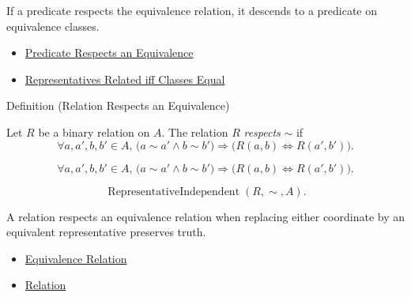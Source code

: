 \begin{remark*}[Interpretation]
If a predicate respects the equivalence relation, it descends to a predicate
on equivalence classes.
\end{remark*}

\begin{dependencies}
\begin{itemize}
  \item \hyperref[def:predicate-respects-equivalence]{Predicate Respects an Equivalence}
  \item \hyperref[prop:representatives-related-iff-classes-equal]{Representatives Related iff Classes Equal}
\end{itemize}
\end{dependencies}

\begin{definitionbox}{Definition (Relation Respects an Equivalence)}
\begin{definition}
\label{def:relation-respects-equivalence}
Let $R$ be a binary relation on $A$. The relation $R$ \emph{respects} $\sim$
if
\[
\forall a,a',b,b'\in A,\,
\bigl(a\sim a'\land b\sim b'\bigr
)
\Longrightarrow
\bigl(R(a,b)\Longleftrightarrow R(a',b')\bigr).
\]
\end{definition}
\end{definitionbox}

\begin{remark*}
\[
\forall a,a',b,b'\in A,\,
\bigl(a\sim a'\land b\sim b'\bigr)
\Longrightarrow
\bigl(R(a,b)\Longleftrightarrow R(a',b')\bigr).
\]
\end{remark*}

\begin{remark*}
\[
\operatorname{RepresentativeIndependent}(R,\sim,A).
\]
\end{remark*}

\begin{remark*}[Interpretation]
A relation respects an equivalence relation when replacing either coordinate
by an equivalent representative preserves truth.
\end{remark*}

\begin{dependencies}
\begin{itemize}
  \item \hyperref[def:equivalence-relation]{Equivalence Relation}
  \item \hyperref[def:relation]{Relation}
\end{itemize}
\end{dependencies}

